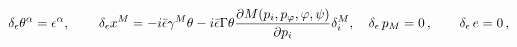 \begin{equation}\label{5}
\delta_\epsilon\theta^\alpha=\epsilon^\alpha, \qquad\,
\delta_\epsilon
x^M=-i\bar\epsilon\gamma^M\theta-i\bar\epsilon\Gamma\theta{\partial
{M(p_i,p_{\varphi},\varphi,\psi)}\over{\partial{p_i}}}\delta^M_i,
\quad \delta_\epsilon\,p_M=0\,,\qquad  \delta_\epsilon\, e=0\,,
\end{equation}

